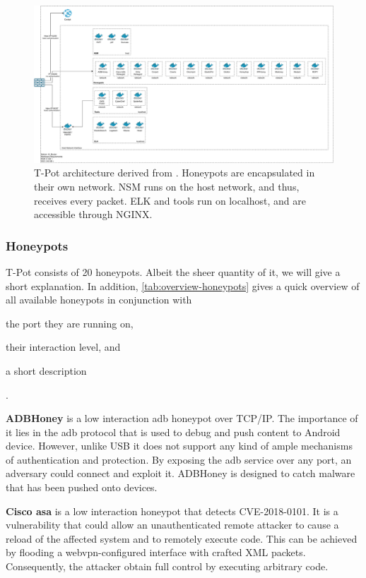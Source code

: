 \begin{figure}
    \centering
    \includegraphics[width=\textwidth]{figures/tpot-architecture.pdf}
    \caption[T-Pot architecture]{T-Pot architecture derived from \cite{tpot2021}. Honeypots are encapsulated in their own network. NSM runs on the host network, and thus, receives every packet. ELK and tools run on localhost, and are accessible through NGINX.}
    \label{fig:overview-tpot}
\end{figure}

\subsubsection{Honeypots}

T-Pot consists of 20 honeypots. Albeit the sheer quantity of it, we will give a short explanation.
In addition, \autoref{tab:overview-honeypots} gives a quick overview of all available honeypots in conjunction with
\begin{enumerate*}[label=(\roman*)]
    \item the port they are running on,
    \item their interaction level, and
    \item a short description
\end{enumerate*}.

\textbf{ADBHoney} \cite{adbhoney2021} is a low interaction \ac{adb} honeypot over TCP/IP.
The importance of it lies in the \ac{adb} protocol that is used to debug and push content to Android device.
However, unlike USB it does not support any kind of ample mechanisms of authentication and protection.
By exposing the \ac{adb} service over any port, an adversary could connect and exploit it.
ADBHoney is designed to catch malware that has been pushed onto devices.

\textbf{Cisco \ac{asa}} \cite{cymmetria2018} is a low interaction honeypot that detects CVE-2018-0101\cite{CVE-2018-0101}.
It is a vulnerability that could allow an unauthenticated remote attacker to cause a reload of the affected system and to remotely execute code.
This can be achieved by flooding a webvpn-configured interface with crafted XML packets.
Consequently, the attacker obtain full control by executing arbitrary code.

